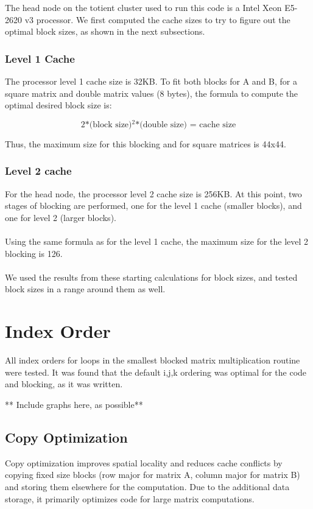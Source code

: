 \documentclass[letterpaper]{article}	 %
\begin{document}
\noindent The head node on the totient cluster used to run this code is a Intel Xeon E5-2620 v3 processor. We first computed the cache sizes to try to figure out the optimal block sizes, as shown in the next subsections. 

\subsubsection{Level 1 Cache}
The processor level 1 cache size is 32KB. To fit both blocks for A and B, for a square matrix and double matrix values (8 bytes), the formula to compute the optimal desired block size is:

\begin{equation}
\text{2*(block size)$^2$*(double size) = cache size}
\end{equation}

\noindent Thus, the maximum size for this blocking and for square matrices is 44x44.

\subsubsection{Level 2 cache}
For the head node, the processor level 2 cache size is 256KB. At this point, two stages of blocking are performed, one for the level 1 cache (smaller blocks), and one for level 2 (larger blocks). \\ \\

Using the same formula as for the level 1 cache, the maximum size for the level 2 blocking is 126. \\ \\

We used the results from these starting calculations for block sizes, and tested block sizes in a range around them as well. 

\section{Index Order}
All index orders for loops in the smallest blocked matrix multiplication routine were tested. It was found that the default i,j,k ordering was optimal for the code and blocking, as it was written.

** Include graphs here, as possible**

\subsection{Copy Optimization}
Copy optimization improves spatial locality and reduces cache conflicts by copying fixed size blocks (row major for matrix A, column major for matrix B) and storing them elsewhere for the computation. Due to the additional data storage, it primarily optimizes code for large matrix computations. 
\end{document}

